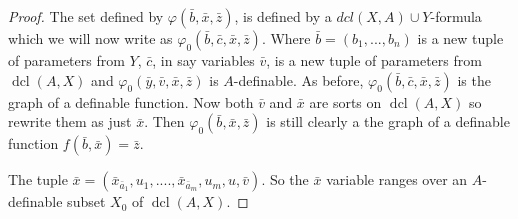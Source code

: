 \documentclass[10pt,a4paper]{amsart}
\def \dcl {\operatorname{dcl}}
\begin{document}
\begin{proof}
The set defined by $\varphi(\bar{b},\bar{x},\bar{z})$, is defined by a $dcl(X,A) \cup Y$-formula which we will now write as $\varphi_0(\bar{b},\bar{c}, \bar{x},\bar{z})$. Where $\bar{b}=(b_1,...,b_n)$ is a new tuple of parameters from $Y$, $\bar{c}$, in say variables $\bar{v}$, is a new tuple of parameters from $\dcl(A,X)$ and $\varphi_0(\bar{y},\bar{v},\bar{x}, \bar{z})$ is $A$-definable. As before, $\varphi_0(\bar{b},\bar{c},\bar{x}, \bar{z})$ is the graph of a definable function. Now both $\bar{v}$ and $\bar{x}$ are sorts on $\dcl(A,X)$ so rewrite them as just $\bar{x}$. Then $\varphi_0(\bar{b},\bar{x},\bar{z})$ is still clearly a the graph of a definable function $f(\bar{b},\bar{x}) = \bar{z}$.

The tuple $\bar{x} = (\bar{x}_{\bar{a}_1},u_1,....,\bar{x}_{\bar{a}_m},u_m,u,\bar{v})$. So the $\bar{x}$ variable ranges over an $A$-definable subset $X_0$ of $\dcl(A,X)$.
\end{proof}
\end{document}
